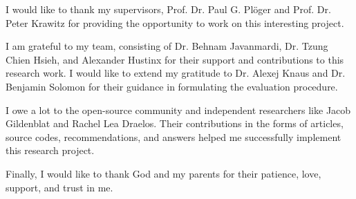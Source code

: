 \documentclass[../report.tex]{subfiles}
\begin{document}
    \begin{acknowledgements}
    \noindent
     I would like to thank my supervisors, Prof. Dr. Paul G. Plöger and Prof. Dr. Peter Krawitz for
     providing the opportunity to work on this interesting project.
     
     
     I am grateful to my team, consisting of Dr. Behnam Javanmardi, Dr. Tzung Chien Hsieh, and  Alexander Hustinx for their support and contributions to this research work. I would like to extend my gratitude to Dr. Alexej Knaus and Dr. Benjamin Solomon for their guidance in formulating the evaluation procedure. 
     
     I owe a lot to the open-source community and independent researchers like Jacob Gildenblat and Rachel Lea Draelos. Their contributions in the forms of articles, source codes, recommendations, and answers helped me successfully implement this research project.  
     
     Finally, I would like to thank God and my parents for their patience, love, support, and trust in me.
    \end{acknowledgements}
\end{document}
